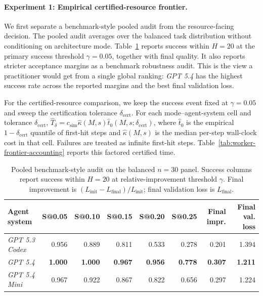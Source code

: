 \documentclass{article}
\begin{document}
\paragraph{Experiment 1: Empirical certified-resource frontier.}

We first separate a benchmark-style pooled audit from the resource-facing decision.
The pooled audit averages over the balanced task distribution without conditioning on architecture mode.
Table~\ref{tab:pooled-benchmark-audit} reports success within \(H=20\) at the primary success threshold \(\gamma=0.05\), together with final quality.
It also reports stricter acceptance margins as a benchmark robustness audit.
This is the view a practitioner would get from a single global ranking: \textit{GPT 5.4} has the highest success rate across the reported margins and the best final validation loss.

For the certified-resource comparison, we keep the success event fixed at \(\gamma=0.05\) and sweep the certification tolerance \(\delta_{\mathrm{cert}}\).
For each mode--agent-system cell and tolerance \(\delta_{\mathrm{cert}}\), \(\widehat T_{\delta}=c_{\mathrm{sim}}\widehat\kappa(M,s)\widehat t_0(M,s;\delta_{\mathrm{cert}})\), where \(\widehat t_0\) is the empirical \(1-\delta_{\mathrm{cert}}\) quantile of first-hit steps and \(\widehat\kappa(M,s)\) is the median per-step wall-clock cost in that cell.
Failures are treated as infinite first-hit steps.
Table~\ref{tab:worker-frontier-accounting} reports this factored certified time.


\begin{table}[t]
\centering
\footnotesize
\setlength{\tabcolsep}{3.2pt}
\caption{Pooled benchmark-style audit on the balanced \(n=30\) panel.
Success columns report success within \(H=20\) at relative-improvement threshold \(\gamma\).
Final improvement is \((L_{\mathrm{init}}-L_{\mathrm{final}})/L_{\mathrm{init}}\); final validation loss is \(L_{\mathrm{final}}\).}
\label{tab:pooled-benchmark-audit}
\begin{tabular}{@{}lrrrrrrr@{}}
\toprule
Agent system & S@0.05 & S@0.10 & S@0.15 & S@0.20 & S@0.25 & Final impr. & Final val. loss \\
\midrule
\textit{GPT 5.3 Codex} & 0.956 & 0.889 & 0.811 & 0.533 & 0.278 & 0.201 & 1.394 \\
\textit{GPT 5.4} & \textbf{1.000} & \textbf{1.000} & \textbf{0.967} & \textbf{0.956} & \textbf{0.778} & \textbf{0.307} & \textbf{1.211} \\
\textit{GPT 5.4 Mini} & 0.967 & 0.922 & 0.867 & 0.822 & 0.656 & 0.297 & 1.224 \\
\bottomrule
\end{tabular}
\end{table}
\end{document}
